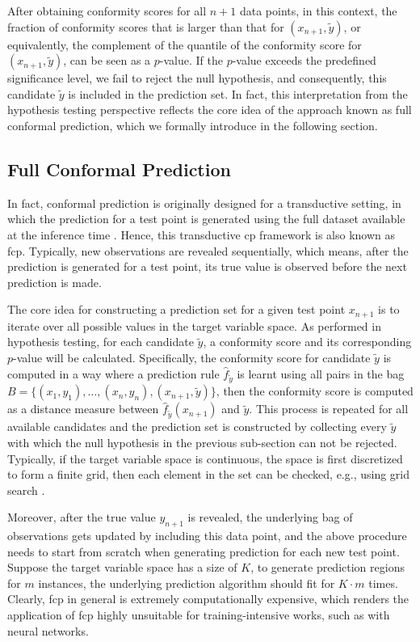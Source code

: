 \noindent After obtaining conformity scores for all $n+1$ data points, in this context, the fraction of conformity scores that is larger than that for $(x_{n+1}, \tilde{y})$, or equivalently, the complement of the quantile of the conformity score for $(x_{n+1}, \tilde{y})$, can be seen as a $p$-value. If the $p$-value exceeds the predefined significance level, we fail to reject the null hypothesis, and consequently, this candidate $\tilde{y}$ is included in the prediction set. In fact, this interpretation from the hypothesis testing perspective reflects the core idea of the approach known as full conformal prediction, which we formally introduce in the following section.

\subsection{Full Conformal Prediction}
In fact, conformal prediction is originally designed for a transductive setting, in which the prediction for a test point is generated using the full dataset available at the inference time \cite{gammerman1998learning}. Hence, this transductive \gls{cp} framework is also known as \gls{fcp}. Typically, new observations are revealed sequentially, which means, after the prediction is generated for a test point, its true value is observed before the next prediction is made. 

The core idea for constructing a prediction set for a given test point $x_{n+1}$ is to iterate over all possible values in the target variable space. As performed in hypothesis testing, for each candidate $\tilde{y}$, a conformity score and its corresponding $p$-value will be calculated. Specifically, the conformity score for candidate $\tilde{y}$ is computed in a way where a prediction rule $\hat{f}_{\tilde{y}}$ is learnt using all pairs in the bag \(B = \{(x_1, y_1), \dots, (x_n, y_n), (x_{n+1}, \tilde{y})\}\), then the conformity score is computed as a distance measure between $\hat{f}_{\tilde{y}}(x_{n+1})$ and $\tilde{y}$. This process is repeated for all available candidates and the prediction set is constructed by collecting every $\tilde{y}$ with which the null hypothesis in the previous sub-section can not be rejected. Typically, if the target variable space is continuous, the space is first discretized to form a finite grid, then each element in the set can be checked, e.g., using grid search \cite{angelopoulos2021gentle}.

Moreover, after the true value $y_{n+1}$ is revealed, the underlying bag of observations gets updated by including this data point, and the above procedure needs to start from scratch when generating prediction for each new test point. Suppose the target variable space has a size of $K$, to generate prediction regions for $m$ instances, the underlying prediction algorithm should fit for $K \cdot m$ times. Clearly, \gls{fcp} in general is extremely computationally expensive, which renders the application of \gls{fcp} highly unsuitable for training-intensive works, such as with neural networks.

